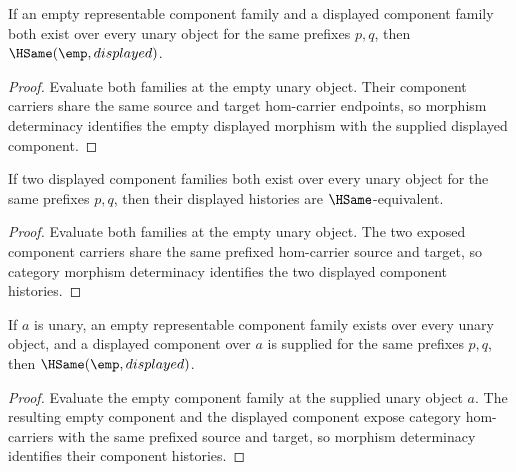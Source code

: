 \begin{theorem}
\label{thm:yoneda-representable-empty-component-family-displayed-deterministic}
If an empty representable component family and a displayed component family
both exist over every unary object for the same prefixes $p,q$, then
$\HSame(\emp,displayed)$.
\end{theorem}
\begin{proof}
Evaluate both families at the empty unary object. Their component carriers
share the same source and target hom-carrier endpoints, so morphism determinacy
identifies the empty displayed morphism with the supplied displayed component.
\end{proof}

\begin{theorem}
\label{thm:yoneda-representable-component-family-displayed-deterministic}
If two displayed component families both exist over every unary object for the
same prefixes $p,q$, then their displayed histories are $\HSame$-equivalent.
\end{theorem}
\begin{proof}
Evaluate both families at the empty unary object. The two exposed component
carriers share the same prefixed hom-carrier source and target, so category
morphism determinacy identifies the two displayed component histories.
\end{proof}

\begin{theorem}
\label{thm:yoneda-representable-empty-component-family-component-deterministic}
If $a$ is unary, an empty representable component family exists over every
unary object, and a displayed component over $a$ is supplied for the same
prefixes $p,q$, then $\HSame(\emp,displayed)$.
\end{theorem}
\begin{proof}
Evaluate the empty component family at the supplied unary object $a$. The
resulting empty component and the displayed component expose category
hom-carriers with the same prefixed source and target, so morphism determinacy
identifies their component histories.
\end{proof}

